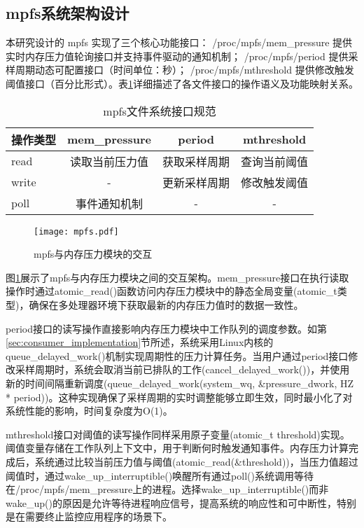 \subsection{mpfs系统架构设计}

本研究设计的 mpfs 实现了三个核心功能接口： /proc/mpfs/mem\_pressure 提供实时内存压力值轮询接口并支持事件驱动的通知机制； /proc/mpfs/period 提供采样周期动态可配置接口（时间单位：秒）； /proc/mpfs/mthreshold 提供修改触发阈值接口（百分比形式）。表\ref{tab:mpfs_files}详细描述了各文件接口的操作语义及功能映射关系。

\begin{table}[htbp]
    \centering
    \caption{mpfs文件系统接口规范}
    \label{tab:mpfs_files}
    \begin{tabular}{lccc}
        \toprule
        \textbf{操作类型} &  mem\_pressure  &  period  &  mthreshold  \\
        \midrule
         read  & 读取当前压力值 & 获取采样周期 & 查询当前阈值 \\
         write  & - & 更新采样周期 & 修改触发阈值 \\
         poll  & 事件通知机制 & - & - \\
        \bottomrule
    \end{tabular}
\end{table}

\begin{figure}[htbp]
  \centering
  \texttt{[image: mpfs.pdf]}
  \caption{mpfs与内存压力模块的交互}
  \label{fig:mpfs}
\end{figure}

图\ref{fig:mpfs}展示了mpfs与内存压力模块之间的交互架构。mem\_pressure接口在执行读取操作时通过atomic\_read()函数访问内存压力模块中的静态全局变量(atomic\_t类型)，确保在多处理器环境下获取最新的内存压力值时的数据一致性。


period接口的读写操作直接影响内存压力模块中工作队列的调度参数。如第\ref{sec:consumer_implementation}节所述，系统采用Linux内核的queue\_delayed\_work()机制实现周期性的压力计算任务。当用户通过period接口修改采样周期时，系统会取消当前已排队的工作(cancel\_delayed\_work())，并使用新的时间间隔重新调度(queue\_delayed\_work(system\_wq, \&pressure\_dwork, HZ * period))。这种实现确保了采样周期的实时调整能够立即生效，同时最小化了对系统性能的影响，时间复杂度为O(1)。

mthreshold接口对阈值的读写操作同样采用原子变量(atomic\_t threshold)实现。阈值变量存储在工作队列上下文中，用于判断何时触发通知事件。内存压力计算完成后，系统通过比较当前压力值与阈值(atomic\_read(\&threshold))，当压力值超过阈值时，通过wake\_up\_interruptible()唤醒所有通过poll()系统调用等待在/proc/mpfs/mem\_pressure上的进程。选择wake\_up\_interruptible()而非wake\_up()的原因是允许等待进程响应信号，提高系统的响应性和可中断性，特别是在需要终止监控应用程序的场景下。



